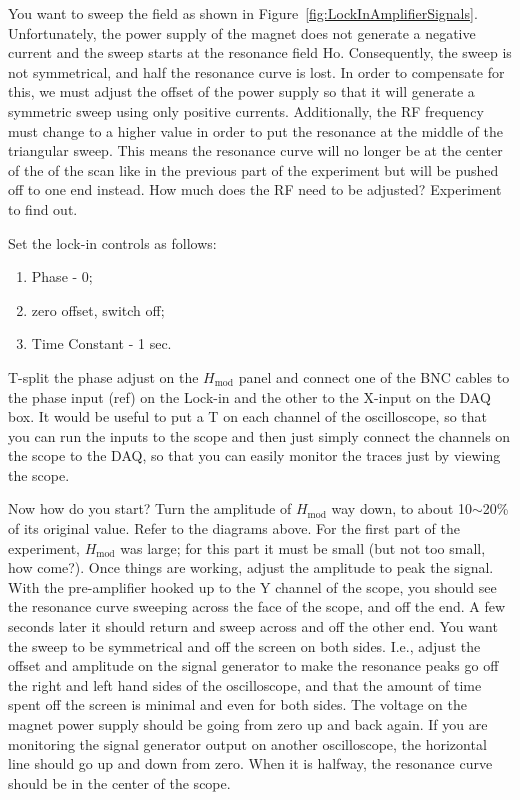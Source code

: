 \documentclass{../lab}
\begin{document}
\newpage

You want to sweep the field as shown in Figure~\ref{fig:LockInAmplifierSignals}. Unfortunately, the power supply of the magnet does not generate a negative current and the sweep starts at the resonance field Ho. Consequently, the sweep is not symmetrical, and half the resonance curve is lost. In order to compensate for this, we must adjust the offset of the power supply so that it will generate a symmetric sweep using only positive currents. Additionally, the RF frequency must change to a higher value in order to put the resonance at the middle of the triangular sweep. This means the resonance curve will no longer be at the center of the of the scan like in the previous part of the experiment but will be pushed off to one end instead. How much does the RF need to be adjusted? Experiment to find out.

Set the lock-in controls as follows:

\begin{enumerate}
    \item Phase - 0;

    \item zero offset, switch off;

    \item Time Constant - 1 sec.
\end{enumerate}

T-split the phase adjust on the $H_\text{mod}$ panel and connect one of the BNC cables to the phase input (ref) on the Lock-in and the other to the X-input on the DAQ box. It would be useful to put a T on each channel of the oscilloscope, so that you can run the inputs to the scope and then just simply connect the channels on the scope to the DAQ, so that you can easily monitor the traces just by viewing the scope.

Now how do you start? Turn the amplitude of $H_\text{mod}$ way down, to about 10$\sim$20\% of its original value. Refer to the diagrams above. For the first part of the experiment, $H_\text{mod}$ was large; for this part it must be small (but not too small, how come?). Once things are working, adjust the amplitude to peak the signal. With the pre-amplifier hooked up to the Y channel of the scope, you should see the resonance curve sweeping across the face of the scope, and off the end. A few seconds later it should return and sweep across and off the other end. You want the sweep to be symmetrical and off the screen on both sides. I.e., adjust the offset and amplitude on the signal generator to make the resonance peaks go off the right and left hand sides of the oscilloscope, and that the amount of time spent off the screen is minimal and even for both sides. The voltage on the magnet power supply should be going from zero up and back again. If you are monitoring the signal generator output on another oscilloscope, the horizontal line should go up and down from zero. When it is halfway, the resonance curve should be in the center of the scope.
\end{document}
